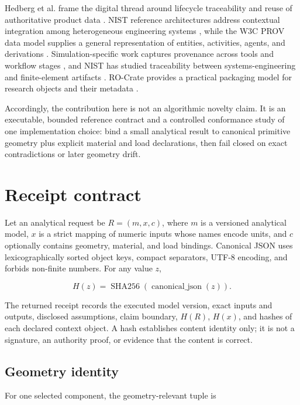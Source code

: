 \documentclass[10pt]{article}
\begin{document}
Hedberg et al. frame the digital thread around lifecycle traceability and reuse
of authoritative product data \cite{hedberg2016}. NIST reference architectures
address contextual integration among heterogeneous engineering systems
\cite{helu2017,nistthread}, while the W3C PROV data model supplies a general
representation of entities, activities, agents, and derivations
\cite{w3cprov}. Simulation-specific work captures provenance across tools and
workflow stages \cite{simprov,olaya2020,horsch2025}, and NIST has studied
traceability between systems-engineering and finite-element artifacts
\cite{nistfea}. RO-Crate provides a practical packaging model for research
objects and their metadata \cite{rocrate}.

Accordingly, the contribution here is not an algorithmic novelty claim. It is
an executable, bounded reference contract and a controlled conformance study of
one implementation choice: bind a small analytical result to canonical
primitive geometry plus explicit material and load declarations, then fail
closed on exact contradictions or later geometry drift.

\section{Receipt contract}

Let an analytical request be $R=(m,x,c)$, where $m$ is a versioned analytical
model, $x$ is a strict mapping of numeric inputs whose names encode units, and
$c$ optionally contains geometry, material, and load bindings. Canonical JSON
uses lexicographically sorted object keys, compact separators, UTF-8 encoding,
and forbids non-finite numbers. For any value $z$,

\begin{equation}
  H(z)=\operatorname{SHA256}(\operatorname{canonical\_json}(z)).
\end{equation}

The returned receipt records the executed model version, exact inputs and
outputs, disclosed assumptions, claim boundary, $H(R)$, $H(x)$, and hashes of
each declared context object. A hash establishes content identity only; it is
not a signature, an authority proof, or evidence that the content is correct.

\subsection{Geometry identity}

For one selected component, the geometry-relevant tuple is
\end{document}
